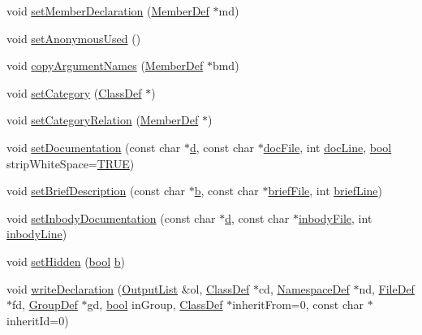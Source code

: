 \begin{DoxyCompactItemize}
void \hyperlink{class_member_def_a125101c79f875e53eabf17f5d0f76a34}{set\+Member\+Declaration} (\hyperlink{class_member_def}{Member\+Def} $\ast$md)
\item 
void \hyperlink{class_member_def_a4026daffd2f67377931fd8f22f689c97}{set\+Anonymous\+Used} ()
\item 
void \hyperlink{class_member_def_aabddaae5675196ee0cb29d2412538358}{copy\+Argument\+Names} (\hyperlink{class_member_def}{Member\+Def} $\ast$bmd)
\item 
void \hyperlink{class_member_def_a9830608ea05ab14ba7383ab5cf3b5b23}{set\+Category} (\hyperlink{class_class_def}{Class\+Def} $\ast$)
\item 
void \hyperlink{class_member_def_a769a002139a8a3e19c68bc4cf82714ff}{set\+Category\+Relation} (\hyperlink{class_member_def}{Member\+Def} $\ast$)
\item 
void \hyperlink{class_member_def_a357486962b5d04cf93dbb52a7a2f2bf6}{set\+Documentation} (const char $\ast$\hyperlink{060__command__switch_8tcl_af43f4b1f0064a33b2d662af9f06d3a00}{d}, const char $\ast$\hyperlink{class_definition_a7c5f8f793b451b8e9bbc68b40a9e8faa}{doc\+File}, int \hyperlink{class_definition_a1eddb1e4af4660518113a159e76ca983}{doc\+Line}, \hyperlink{qglobal_8h_a1062901a7428fdd9c7f180f5e01ea056}{bool} strip\+White\+Space=\hyperlink{qglobal_8h_a04a6422a52070f0dc478693da640242b}{T\+R\+U\+E})
\item 
void \hyperlink{class_member_def_ac4a25886f70c3888e60c8e5d736720e5}{set\+Brief\+Description} (const char $\ast$\hyperlink{060__command__switch_8tcl_a68bdb74c144118d936931c46f75d4b3e}{b}, const char $\ast$\hyperlink{class_definition_a3c37121dca58fcb1c3d499b52e0a70fd}{brief\+File}, int \hyperlink{class_definition_a26799d5c03900e931fb1382a5aa56bdd}{brief\+Line})
\item 
void \hyperlink{class_member_def_a6c64c400180a47b04ad9a1d18a535184}{set\+Inbody\+Documentation} (const char $\ast$\hyperlink{060__command__switch_8tcl_af43f4b1f0064a33b2d662af9f06d3a00}{d}, const char $\ast$\hyperlink{class_definition_afcb2ccbaedf4f06fee6f332c3468f370}{inbody\+File}, int \hyperlink{class_definition_aa443907e0f5fe04afb2851068c95d706}{inbody\+Line})
\item 
void \hyperlink{class_member_def_a35f13f7f0e73abea45db7e6794c3fc11}{set\+Hidden} (\hyperlink{qglobal_8h_a1062901a7428fdd9c7f180f5e01ea056}{bool} \hyperlink{060__command__switch_8tcl_a68bdb74c144118d936931c46f75d4b3e}{b})
\item 
void \hyperlink{class_member_def_a73f56d5c2ca4ec4807a94c272d752e13}{write\+Declaration} (\hyperlink{class_output_list}{Output\+List} \&ol, \hyperlink{class_class_def}{Class\+Def} $\ast$cd, \hyperlink{class_namespace_def}{Namespace\+Def} $\ast$nd, \hyperlink{class_file_def}{File\+Def} $\ast$fd, \hyperlink{class_group_def}{Group\+Def} $\ast$gd, \hyperlink{qglobal_8h_a1062901a7428fdd9c7f180f5e01ea056}{bool} in\+Group, \hyperlink{class_class_def}{Class\+Def} $\ast$inherit\+From=0, const char $\ast$inherit\+Id=0)

\end{DoxyCompactItemize}
